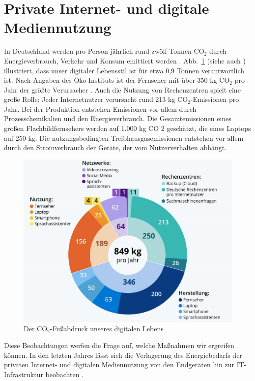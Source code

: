 \documentclass{article}
\begin{document}
\section{Private Internet- und digitale Mediennutzung}
In Deutschland werden  pro Person jährlich rund zwölf Tonnen CO$_2$ durch Energieverbrauch, Verkehr und Konsum  emittiert werden \cite{energieeffizienz_IT_2020}. 
Abb.~\ref{fig:DiagrammCO2Fuss} (siehe auch \cite{infografik_DigFuss_2022}) illustriert, dass  unser digitaler Lebensstil ist für etwa 0,9 Tonnen verantwortlich ist. Nach Angaben des Öko-Instituts ist der Fernseher mit über 350 kg CO$_2$ pro Jahr der größte Verursacher \cite{energieeffizienz_IT_2020}. Auch die Nutzung von Rechenzentren spielt eine große Rolle: Jeder Internetnutzer verursacht rund 213 kg CO$_2$-Emissionen pro Jahr.
Bei der Produktion entstehen Emissionen vor allem durch Prozesschemikalien und den Energieverbrauch. Die Gesamtemissionen eines großen Flachbildfernsehers werden auf 1.000 kg CO 2 geschätzt, die eines Laptops auf 250 kg.
Die nutzungsbedingten Treibhausgasemissionen entstehen vor allem durch den Stromverbrauch der Geräte, der vom Nutzerverhalten abhängt\cite{energieeffizienz_IT_2020}. 

\begin{figure}[h]
	\centering
		\includegraphics[width=.9\linewidth]{../Figures/Diagramm CO₂-Fußabdruck unseres digitalen Lebens.jpeg}	
	\caption{\label{fig:DiagrammCO2Fuss} Der CO$_2$-Fußabdruck unseres digitalen Lebens}
\end{figure}


Diese Beobachtungen werfen die Frage auf, welche Maßnahmen wir ergreifen können.
In den letzten Jahres lässt sich die Verlagerung
des Energiebedarfs der privaten Internet- und digitalen Mediennutzung
von den Endgeräten hin zur IT-Infrastruktur beobachten \cite{grunwald_energieverbrauch_2022}. 
\end{document}
